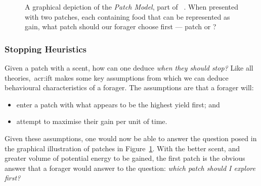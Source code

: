 \begin{figure}[t!]
    \centering
    \caption[The patch model]{A graphical depiction of the \emph{Patch Model}, part of ~. When presented with two patches, each containing food that can be represented as gain, what patch should our forager choose first — patch  or ?}
    \label{fig:patch_model}
\end{figure}

\subsubsection{Stopping Heuristics}\label{sec:stopping_background:theoretical:ift:stopping}
Given a patch with a scent, how can one deduce \emph{when they should stop?} Like all theories,~\gls{acr:ift} makes some key assumptions from which we can deduce behavioural characteristics of a forager. The assumptions are that a forager will:

\begin{itemize}
    \item{enter a patch with what appears to be the highest yield first; and}
    \item{attempt to maximise their gain per unit of time.}
\end{itemize}

Given these assumptions, one would now be able to answer the question posed in the graphical illustration of patches in Figure~\ref{fig:patch_model}. With the better scent, and greater volume of potential energy to be gained, the first patch is the obvious answer that a forager would answer to the question: \emph{which patch should I explore first?}

